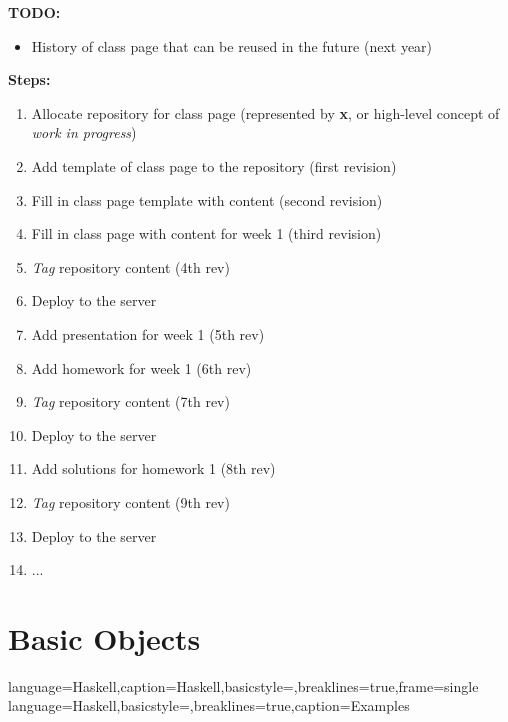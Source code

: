 \documentclass[11pt]{article}
\begin{document}
\textbf{TODO:}
\begin{itemize}
\item History of class page that can be reused in the future (next year)
\end{itemize}

\textbf{Steps:}
\begin{enumerate}
\item Allocate repository for class page (represented by \textbf{x}, or high-level concept of \textit{work in progress})
\item Add template of class page to the repository (first revision)
\item Fill in class page template with content (second revision)
\item Fill in class page with content for week 1 (third revision)
\item \textit{Tag} repository content (4th rev)
\item Deploy to the server
\item Add presentation for week 1 (5th rev)
\item Add homework for week 1 (6th rev)
\item \textit{Tag} repository content (7th rev)
\item Deploy to the server
\item Add solutions for homework 1 (8th rev)
\item \textit{Tag} repository content (9th rev)
\item Deploy to the server
\item ...
\end{enumerate}



\section{Basic Objects}
\label{sec:objects}


{
	language=Haskell,caption=Haskell,basicstyle=\footnotesize\ttfamily,breaklines=true,frame=single
}
{
	language=Haskell,basicstyle=\footnotesize\ttfamily,breaklines=true,caption=Examples
}
\lstset{style=Haskell}          %
\end{document}
